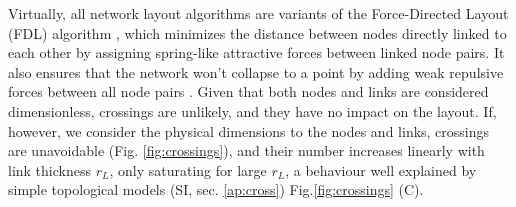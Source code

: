 \documentclass[nofootinbib,preprint,floatfix,endfloats]{revtex4} %
\begin{document}
Virtually, all network layout algorithms are variants of the Force-Directed Layout (FDL) algorithm \cite{kamada1989algorithm,davidson1996drawing,fruchterman1991graph,barnes1986hierarchical}, which minimizes the distance between nodes directly linked to each other by assigning spring-like attractive forces between linked node pairs. It also ensures that the network won't collapse to a point by adding weak repulsive forces between all node pairs %
 \cite{kabourov2015spring}.
 Given that both nodes and links are considered dimensionless, crossings are unlikely, and they have no impact on the layout.
If, however, we consider the physical dimensions to the nodes and links, crossings are unavoidable (Fig. \ref{fig:crossings}), and their number increases 
linearly with link thickness $r_L$, only saturating for large $r_L$, a behaviour well explained by simple topological models (SI, sec. \ref{ap:cross})
Fig.\ref{fig:crossings} (C).%
\end{document}
